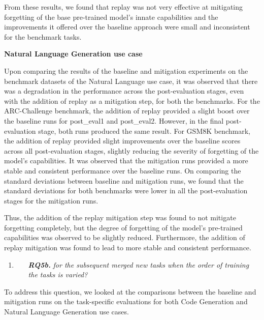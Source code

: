 From these results, we found that replay was not very effective at mitigating forgetting of the base pre-trained model's innate capabilities and the improvements it offered over the baseline approach were small and inconsistent for the benchmark tasks.

\textbf{Natural Language Generation use case}

Upon comparing the results of the baseline and mitigation experiments on the benchmark datasets of the Natural Language use case, it was observed that there was a degradation in the performance across the post-evaluation stages, even with the addition of replay as a mitigation step, for both the benchmarks. For the ARC-Challenge benchmark, the addition of replay provided a slight boost over the baseline runs for post\_eval1 and post\_eval2. However, in the final post-evaluation stage, both runs produced the same result. For GSM8K benchmark, the addition of replay provided slight improvements over the baseline scores across all post-evaluation stages, slightly reducing the severity of forgetting of the model's capabilities. It was observed that the mitigation runs provided a more stable and consistent performance over the baseline runs. On comparing the standard deviations between baseline and mitigation runs, we found that the standard deviations for both benchmarks were lower in all the post-evaluation stages for the mitigation runs.

Thus, the addition of the replay mitigation step was found to not mitigate forgetting completely, but the degree of forgetting of the model's pre-trained capabilities was observed to be slightly reduced. Furthermore, the addition of replay mitigation was found to lead to more stable and consistent performance.

\newcommand{\RQfiveb}{for the subsequent merged new tasks when the order of training the tasks is varied?}

\begin{enumerate}
\item  
    \begin{enumerate}
        \item[\textit{\textbf{RQ5b.}}] \textit{\RQfiveb}
    \end{enumerate}
\end{enumerate}

To address this question, we looked at the comparisons between the baseline and mitigation runs on the task-specific evaluations for both Code Generation and Natural Language Generation use cases. 


